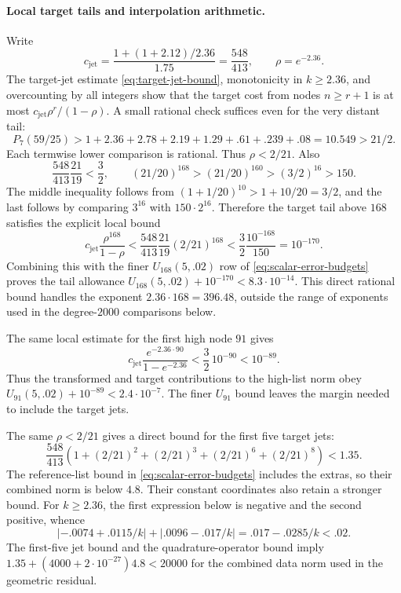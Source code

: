 \paragraph{Local target tails and interpolation arithmetic.}
Write
\[
 c_{\mathrm{jet}}=\frac{1+(1+2.12)/2.36}{1.75}
 =\frac{548}{413},\qquad \rho=e^{-2.36}.
\]
The target-jet estimate \eqref{eq:target-jet-bound}, monotonicity in
$k\ge2.36$, and overcounting by all integers show that the target cost
from nodes $n\ge r+1$ is at most
$c_{\mathrm{jet}}\rho^r/(1-\rho)$.  A small rational check suffices even
for the very distant tail:
\[
 P_7(59/25)>1+2.36+2.78+2.19+1.29+.61+.239+.08
 =10.549>21/2.
\]
Each termwise lower comparison is rational.  Thus
$\rho<2/21$.  Also
\[
 \frac{548}{413}\frac{21}{19}<\frac32,\qquad
 (21/20)^{168}>(21/20)^{160}>
 (3/2)^{16}>150.
\]
The middle inequality follows from
$(1+1/20)^{10}>1+10/20=3/2$, and the last follows by comparing
$3^{16}$ with $150\cdot2^{16}$.  Therefore the target tail above $168$
satisfies the explicit local bound
\begin{equation}\label{eq:target-tail-168}
 c_{\mathrm{jet}}\frac{\rho^{168}}{1-\rho}
 <\frac{548}{413}\frac{21}{19}(2/21)^{168}
 <\frac{3}{2}\frac{10^{-168}}{150}=10^{-170}.
\end{equation}
Combining this with the finer $U_{168}(5,.02)$ row of
\eqref{eq:scalar-error-budgets} proves the tail allowance
$U_{168}(5,.02)+10^{-170}<8.3\cdot10^{-14}$.
This direct rational bound handles the exponent
$2.36\cdot168=396.48$, outside the range of exponents used in the
degree-$2000$ comparisons below.

The same local estimate for the first high node $91$ gives
\begin{equation}\label{eq:target-tail-91}
 c_{\mathrm{jet}}\frac{e^{-2.36\cdot90}}{1-e^{-2.36}}
 <\frac32\,10^{-90}<10^{-89}.
\end{equation}
Thus the transformed and target contributions to the high-list norm obey
$U_{91}(5,.02)+10^{-89}<2.4\cdot10^{-7}$.  The finer $U_{91}$ bound
leaves the margin needed to include the target jets.

The same $\rho<2/21$ gives a direct bound for the first five target jets:
\[
 \frac{548}{413}\left(1+(2/21)^2+(2/21)^3+(2/21)^6+(2/21)^8\right)
 <1.35.
\]
The reference-list bound in \eqref{eq:scalar-error-budgets} includes the
extras, so their combined norm is below $4.8$.  Their constant coordinates
also retain a stronger bound.  For $k\ge2.36$, the first expression below
is negative and the second positive, whence
\[
 |-.0074+.0115/k|+|.0096-.017/k|
 =.017-.0285/k<.02.
\]
The first-five jet bound and the quadrature-operator bound imply
$1.35+(4000+2\cdot10^{-27})4.8<20000$ for the combined data norm
used in the geometric residual.

